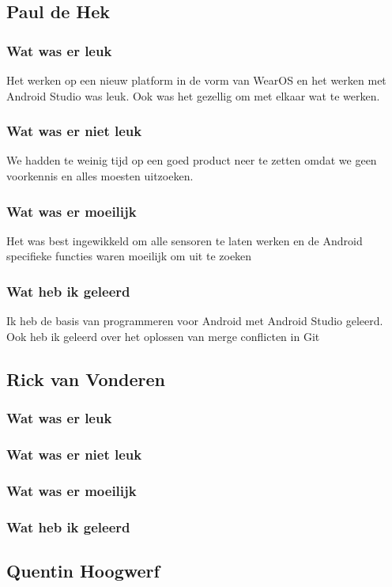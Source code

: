 \documentclass[../main.tex]{subfiles}
\begin{document}
\subsection{Paul de Hek}
\subsubsection{Wat was er leuk}
Het werken op een nieuw platform in de vorm van WearOS en het werken met Android Studio was leuk. Ook
was het gezellig om met elkaar wat te werken.
\subsubsection{Wat was er niet leuk}
We hadden te weinig tijd op een goed product neer te zetten omdat we geen voorkennis en alles moesten
uitzoeken.
\subsubsection{Wat was er moeilijk}
Het was best ingewikkeld om alle sensoren te laten werken en de Android specifieke functies waren
moeilijk om uit te zoeken
\subsubsection{Wat heb ik geleerd}
Ik heb de basis van programmeren voor Android met Android Studio geleerd. Ook heb ik geleerd over
het oplossen van merge conflicten in Git
\newpage

\subsection{Rick van Vonderen}
\subsubsection{Wat was er leuk}
\subsubsection{Wat was er niet leuk}
\subsubsection{Wat was er moeilijk}
\subsubsection{Wat heb ik geleerd}
\newpage

\subsection{Quentin Hoogwerf}
\end{document}
